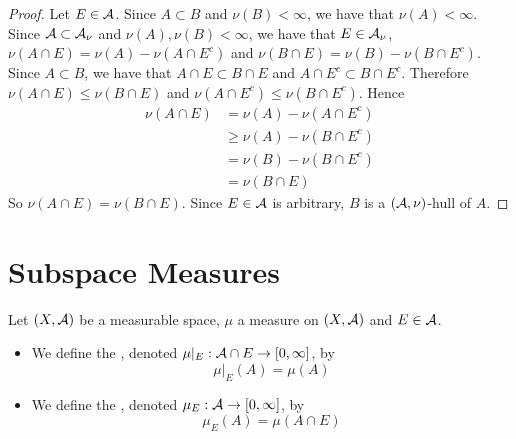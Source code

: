 \documentclass{book}
\begin{document}
	\begin{proof}
		Let $E \in \mathcal{A}$. Since $A \subset B$ and $\nu(B) < \infty$, we have that $\nu(A) < \infty$. Since $\mathcal{A} \subset \mathcal{A}_{\nu}$ and $\nu(A), \nu(B) < \infty$, we have that $E \in \mathcal{A}_{\nu}$, $\nu(A \cap E) = \nu(A) - \nu(A \cap E^c)$ and $\nu(B \cap E) = \nu(B) - \nu(B \cap E^c)$. Since $A \subset B$, we have that $A \cap E \subset B \cap E$ and $A \cap E^c \subset B \cap E^c$. Therefore $\nu(A \cap E) \leq \nu(B \cap E)$ and $\nu(A \cap E^c) \leq \nu(B \cap E^c)$. Hence
		\begin{align*}
			\nu(A \cap E)
			& = \nu(A) - \nu(A \cap E^c) \\
			& \geq \nu(A) - \nu(B \cap E^c) \\
			& = \nu(B) - \nu(B \cap E^c) \\
			& = \nu(B \cap E)
		\end{align*}
		So $\nu(A \cap E) = \nu(B \cap E)$. Since $E \in \mathcal{A}$ is arbitrary, $B$ is a $(\mathcal{A}, \nu)$-hull of $A$.
	\end{proof}

	
	
	
	
	
	
	
	
	
	
	
	
	
	
	
	
	
	
	
	
	
	
	
	
	
	
	
	
	
	
	\newpage
	\section{Subspace Measures}
	
	\begin{defn}  
		Let $(X, \mathcal{A})$ be a measurable space, $\mu$ a measure on $(X, \mathcal{A})$ and $E \in \mathcal{A}$. 
		\begin{itemize}
			\item We define the , denoted $\mu|_E: \mathcal{A} \cap E \rightarrow [0,\infty]$, by 
			$$\mu|_E(A) = \mu(A)$$
			\item We define the , denoted $\mu_E: \mathcal{A} \rightarrow [0,\infty]$, by 
			$$\mu_E(A) = \mu(A \cap E)$$
		\end{itemize}
	\end{defn}
\end{document}
